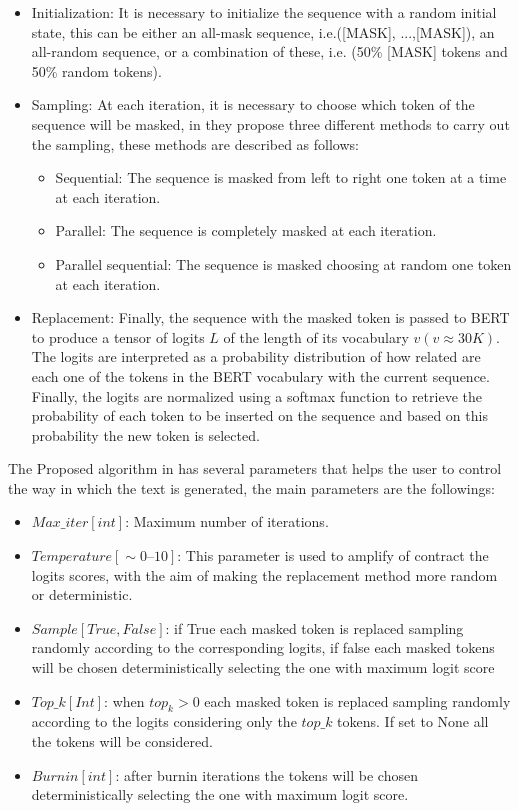 \documentclass[10pt,twocolumn,letterpaper]{article}
\begin{document}
\begin{itemize}
\item Initialization: It is necessary to initialize the sequence with a random initial state, this can be either an all-mask sequence,
i.e.([MASK], ...,[MASK]), an all-random sequence, or a combination of these, i.e. (50\% [MASK] tokens and 50\% random tokens).
\item Sampling: At each iteration, it is necessary to choose which token of the sequence will be masked, in \cite{wang2019bert}
they propose three different methods to carry out the sampling, these methods are described as follows:
\begin{itemize}
   \item Sequential: The sequence is masked from left to right one token at a time at each iteration.
   \item Parallel: The sequence is completely masked at each iteration.
   \item Parallel sequential: The sequence is masked choosing at random one token at each iteration.
\end{itemize}
\item Replacement: Finally, the sequence with the masked token is passed to BERT to produce a tensor of logits $L$ of
the length of its vocabulary $v (v \approx 30K)$. The logits are interpreted as a probability distribution of how related
are each one of the tokens in the BERT vocabulary with the current sequence. Finally, the logits are normalized using a
softmax function to retrieve the probability of each token to be inserted on the sequence and based on this probability
the new token is selected.
\end{itemize}

The Proposed algorithm in \cite{wang2019bert} has several parameters that helps the user to control the way in which
the text is generated, the main parameters are the followings:

\begin{itemize}
   \item $ Max\_iter [int] $: Maximum number of iterations.
   \item $ Temperature [\sim 0–10] $: This parameter is used to amplify of contract the logits scores,
   with the aim of making the replacement method more random or deterministic.
   \item $ Sample [True, False] $: if True each masked token is replaced sampling randomly according to the
   corresponding logits, if false each masked tokens will be chosen deterministically selecting the one with maximum logit score
   \item $ Top\_k[Int] $: when $top_k > 0$ each masked token is replaced sampling randomly according to the logits
   considering only the $top\_k$ tokens. If set to None all the tokens will be considered.
   \item $ Burnin[int] $: after burnin iterations the tokens will be chosen deterministically
   selecting the one with maximum logit score.
\end{itemize}
\end{document}
